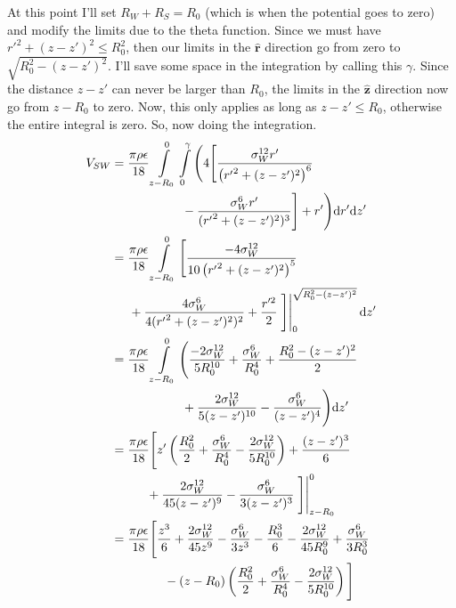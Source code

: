 \documentclass[letterpaper,twocolumn,amsmath,amssymb,prb]{revtex4-1}
\begin{document}
At this point I'll set $R_W + R_S = R_0$ (which is when the potential
goes to zero) and modify the limits due to the theta function. Since
we must have ${r'}^2 + (z-z')^2 \leq R_0^2$, then our limits in the
$\mathbf{\hat{r}}$ direction go from zero to $\sqrt{R_0^2 -
  (z-z')^2}$. I'll save some space in the integration by calling this
$\gamma$.  Since the distance $z-z'$ can never be larger than $R_0$,
the limits in the $\mathbf{\hat{z}}$ direction now go from $z-R_0$ to
zero. Now, this only applies as long as $z-z' \leq R_0$, otherwise the
entire integral is zero. So, now doing the integration.
\begin{align}
  V_{SW} &= \frac{\pi\rho\epsilon}{18} \int\limits_{z-R_0}^0
  \int\limits_{0}^{\gamma} \Bigg( 4 \Bigg[
    \frac{\sigma_W^{12}r'}{\left({r'}^2 + (z-z')^2\right)^6} \notag \\
    &\hspace{2cm}-\frac{\sigma_W^6r'}{({r'}^2 + (z-z')^2)^3} \Bigg]
  + r' \Bigg) \textrm{d}r' \textrm{d}z' \\
  &= \frac{\pi\rho\epsilon}{18} \int\limits_{z-R_0}^0
  \Bigg[\frac{-4\sigma_W^{12}}{10\left({r'}^2 + (z-z')^2\right)^5}
    \notag \\
    &\hspace{0.5cm}+\frac{4\sigma_W^6}{4({r'}^2 + (z-z')^2)^2}
  + \frac{r'^2}{2} \left.\Bigg]\right|_0^{\sqrt{R_0^2 - (z-z')^2}} \textrm{d}z' \\
  &= \frac{\pi\rho\epsilon}{18} \int\limits_{z-R_0}^0 \Bigg(
  \frac{-2\sigma_W^{12}}{5R_0^{10}} + \frac{\sigma_W^6}{R_0^4}
  +\frac{R_0^2 - (z-z')^2}{2} \notag \\
  &\hspace{2cm}+ \frac{2\sigma_W^{12}}{5(z-z')^{10}} - \frac{\sigma_W^6}{(z-z')^4}
  \Bigg) \textrm{d}z' \\
  &= \frac{\pi\rho\epsilon}{18} \Bigg[ z'\left(\frac{R_0^2}{2} +
    \frac{\sigma_W^6}{R_0^4} - \frac{2\sigma_W^{12}}{5R_0^{10}}\right)
    + \frac{(z-z')^3}{6} \notag \\
    &\hspace{1cm}+ \frac{2\sigma_W^{12}}{45(z-z')^9} -
    \frac{\sigma_W^6}{3(z-z')^3}\left.\Bigg] \right|_{z-R_0}^0 \\
  &= \frac{\pi\rho\epsilon}{18} \Bigg[ \frac{z^3}{6} + \frac{2\sigma_W^{12}}{45z^9} -
    \frac{\sigma_W^6}{3z^3} - \frac{R_0^3}{6} - \frac{2\sigma_W^{12}}{45R_0^9} +
    \frac{\sigma_W^6}{3R_0^3} \notag \\
    & \hspace{1.5cm}- (z-R_0)\left(\frac{R_0^2}{2} +
    \frac{\sigma_W^6}{R_0^4} - \frac{2\sigma_W^{12}}{5R_0^{10}}\right) \Bigg]
\end{align}
\end{document}
